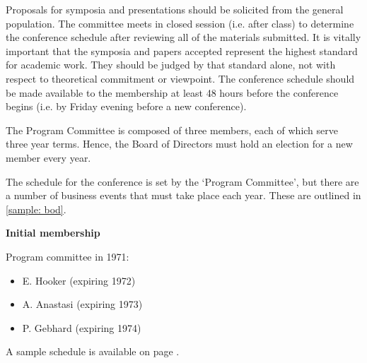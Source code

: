 \begin{refsection}
Proposals for symposia and presentations should be solicited from the general population. The committee meets in closed session (i.e. after class) to determine the conference schedule after reviewing all of the materials submitted. It is vitally important that the symposia and papers accepted represent the highest standard for academic work. They should be judged by that standard alone, not with respect to theoretical commitment or viewpoint. The conference schedule should be made available to the membership at least 48 hours before the conference begins (i.e. by Friday evening before a new conference).

The Program Committee is composed of three members, each of which serve three year terms. Hence, the Board of Directors must hold an election for a new member every year.

The schedule for the conference is set by the `Program Committee', but there are a number of business events that must take place each year. These are outlined in \ref{sample: bod}.

\textbf{Initial membership}

Program committee in 1971:

\begin{itemize}
\item E. Hooker (expiring 1972)

\item A. Anastasi (expiring 1973)

\item P. Gebhard (expiring 1974)

\end{itemize}

A sample schedule is available on page \pageref{sample:bod}.




\begin{enumerate}


\end{enumerate}
\end{refsection}
